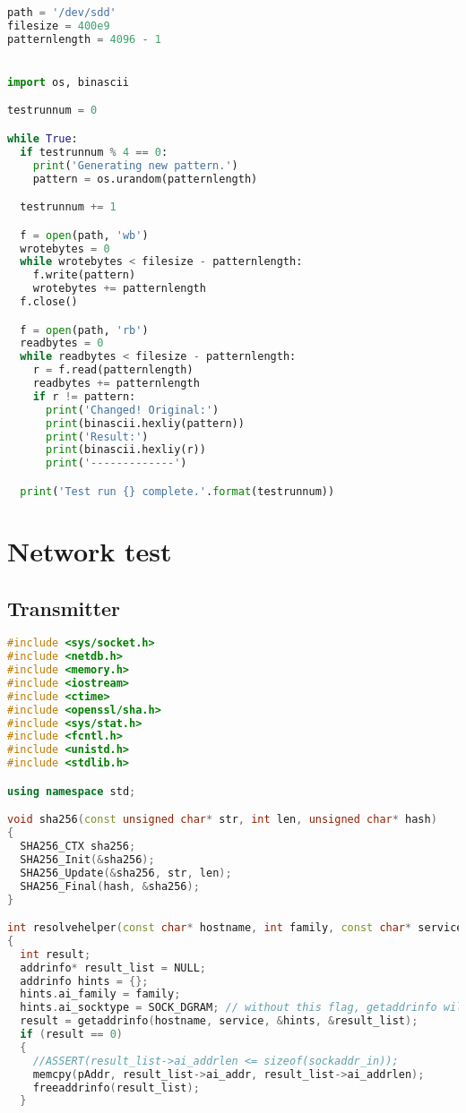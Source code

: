 \begin{appendices}
\begin{lstlisting}[language=Python]
path = '/dev/sdd'
filesize = 400e9
patternlength = 4096 - 1


import os, binascii

testrunnum = 0

while True:
  if testrunnum % 4 == 0:
    print('Generating new pattern.')
    pattern = os.urandom(patternlength)

  testrunnum += 1

  f = open(path, 'wb')
  wrotebytes = 0
  while wrotebytes < filesize - patternlength:
    f.write(pattern)
    wrotebytes += patternlength
  f.close()

  f = open(path, 'rb')
  readbytes = 0
  while readbytes < filesize - patternlength:
    r = f.read(patternlength)
    readbytes += patternlength
    if r != pattern:
      print('Changed! Original:')
      print(binascii.hexliy(pattern))
      print('Result:')
      print(binascii.hexliy(r))
      print('-------------')

  print('Test run {} complete.'.format(testrunnum))
\end{lstlisting}

\section{Network test}\label{Apdx-network}
\subsection{Transmitter}
\begin{lstlisting}[language=C++]
#include <sys/socket.h>
#include <netdb.h>
#include <memory.h>
#include <iostream>
#include <ctime>
#include <openssl/sha.h>
#include <sys/stat.h>
#include <fcntl.h>
#include <unistd.h>
#include <stdlib.h>

using namespace std;

void sha256(const unsigned char* str, int len, unsigned char* hash)
{
  SHA256_CTX sha256;
  SHA256_Init(&sha256);
  SHA256_Update(&sha256, str, len);
  SHA256_Final(hash, &sha256);
}

int resolvehelper(const char* hostname, int family, const char* service, sockaddr_storage* pAddr)
{
  int result;
  addrinfo* result_list = NULL;
  addrinfo hints = {};
  hints.ai_family = family;
  hints.ai_socktype = SOCK_DGRAM; // without this flag, getaddrinfo will return 3x the number of addresses (one for each socket type).
  result = getaddrinfo(hostname, service, &hints, &result_list);
  if (result == 0)
  {
    //ASSERT(result_list->ai_addrlen <= sizeof(sockaddr_in));
    memcpy(pAddr, result_list->ai_addr, result_list->ai_addrlen);
    freeaddrinfo(result_list);
  }


\end{lstlisting}
\end{appendices}
